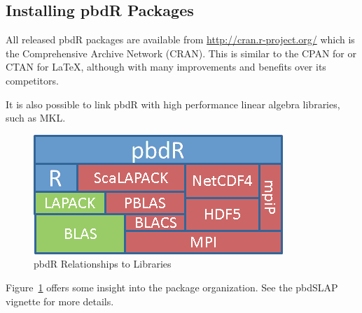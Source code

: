 \subsection{Installing pbdR Packages}
All released pbdR packages are available from \url{http://cran.r-project.org/} which is the Comprehensive  Archive Network (CRAN).  This is similar to the CPAN for  or CTAN for \LaTeX, although with many improvements and benefits over its competitors.

It is also possible to link pbdR with high performance linear algebra libraries, such as MKL.
\begin{figure}[h]
\centering
\includegraphics[scale=.7]{pics/libs.png}
\caption{pbdR Relationships to Libraries}\label{fig:pbd}
\end{figure}
Figure~\ref{fig:pbd} offers some insight into the package organization.  See the pbdSLAP vignette for more details.